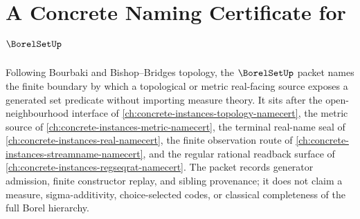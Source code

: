 \chapter{A Concrete Naming Certificate for $\BorelSetUp$}
\label{ch:concrete-instances-borel-set-namecert}

Following Bourbaki and Bishop--Bridges topology, the $\BorelSetUp$ packet names the finite boundary by which a topological or metric real-facing source exposes a generated set predicate without importing measure theory. It sits after the open-neighbourhood interface of \autoref{ch:concrete-instances-topology-namecert}, the metric source of \autoref{ch:concrete-instances-metric-namecert}, the terminal real-name seal of \autoref{ch:concrete-instances-real-namecert}, the finite observation route of \autoref{ch:concrete-instances-streamname-namecert}, and the regular rational readback surface of \autoref{ch:concrete-instances-regseqrat-namecert}. The packet records generator admission, finite constructor replay, and sibling provenance; it does not claim a measure, sigma-additivity, choice-selected codes, or classical completeness of the full Borel hierarchy.

